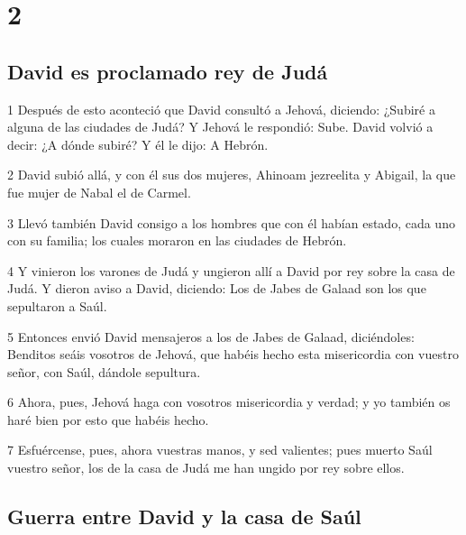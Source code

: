 \chapter{2}

\section*{David es proclamado rey de Judá}

\par 1 Después de esto aconteció que David consultó a Jehová, diciendo: ¿Subiré a alguna de las ciudades de Judá? Y Jehová le respondió: Sube. David volvió a decir: ¿A dónde subiré? Y él le dijo: A Hebrón. 
\par 2 David subió allá, y con él sus dos mujeres, Ahinoam jezreelita y Abigail, la que fue mujer de Nabal el de Carmel. 
\par 3 Llevó también David consigo a los hombres que con él habían estado, cada uno con su familia; los cuales moraron en las ciudades de Hebrón.
\par 4 Y vinieron los varones de Judá y ungieron allí a David por rey sobre la casa de Judá. Y dieron aviso a David, diciendo: Los de Jabes de Galaad son los que sepultaron a Saúl.
\par 5 Entonces envió David mensajeros a los de Jabes de Galaad, diciéndoles: Benditos seáis vosotros de Jehová, que habéis hecho esta misericordia con vuestro señor, con Saúl, dándole sepultura. 
\par 6 Ahora, pues, Jehová haga con vosotros misericordia y verdad; y yo también os haré bien por esto que habéis hecho.
\par 7 Esfuércense, pues, ahora vuestras manos, y sed valientes; pues muerto Saúl vuestro señor, los de la casa de Judá me han ungido por rey sobre ellos.

\section*{Guerra entre David y la casa de Saúl}

